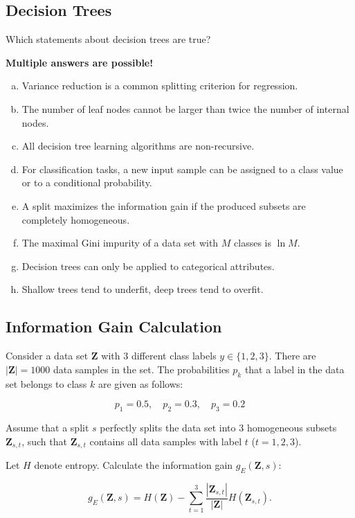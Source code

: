 \documentclass{article}
\begin{document}
\subsection*{Decision Trees}

Which statements about decision trees are true?

\textbf{Multiple answers are possible!}

\begin{enumerate}[(a)]
    \item Variance reduction is a common splitting criterion for regression.
    \item The number of leaf nodes cannot be larger than twice the number of internal nodes.
    \item All decision tree learning algorithms are non-recursive.
    \item For classification tasks, a new input sample can be assigned to a class value or to a conditional probability.
    \item A split maximizes the information gain if the produced subsets are completely homogeneous.
    \item The maximal Gini impurity of a data set with \(M\) classes is \(\ln M\).
    \item Decision trees can only be applied to categorical attributes.
    \item Shallow trees tend to underfit, deep trees tend to overfit.
\end{enumerate}

\subsection*{Information Gain Calculation}

Consider a data set \(\mathbf{Z}\) with 3 different class labels \(y \in \{1, 2, 3\}\). There are \(|\mathbf{Z}| = 1000\) data samples in the set. The probabilities \(p_k\) that a label in the data set belongs to class \(k\) are given as follows:

\[
p_1 = 0.5, \quad p_2 = 0.3, \quad p_3 = 0.2
\]

Assume that a split \(s\) perfectly splits the data set into 3 homogeneous subsets \(\mathbf{Z}_{s,t}\), such that \(\mathbf{Z}_{s,t}\) contains all data samples with label \(t\) (\(t = 1, 2, 3\)).

Let \(H\) denote entropy. Calculate the information gain \(g_E(\mathbf{Z}, s)\):

\[
g_E(\mathbf{Z}, s) = H(\mathbf{Z}) - \sum_{t=1}^3 \frac{|\mathbf{Z}_{s,t}|}{|\mathbf{Z}|} H(\mathbf{Z}_{s,t}).
\]
\end{document}
